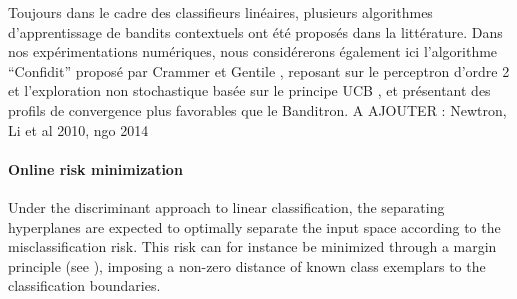 \documentclass[preprint,12pt,authoryear]{elsarticle}
\begin{document}
{\color{blue}
Toujours dans le cadre des classifieurs linéaires, plusieurs algorithmes d'apprentissage de bandits contextuels ont été proposés dans la littérature. Dans nos expérimentations numériques, nous considérerons également ici l'algorithme ``Confidit'' proposé par Crammer et Gentile \cite{crammer2013multiclass}, reposant sur le perceptron d'ordre 2 et l'exploration non stochastique basée sur le principe UCB \cite{lai1985asymptotically}, et présentant des profils de convergence plus favorables que le Banditron. A AJOUTER : Newtron, Li et al 2010, ngo 2014}



\paragraph{Online risk minimization}
Under the discriminant approach to linear classification, the separating hyperplanes are expected to optimally separate the input space according to the misclassification risk. This risk can for instance be minimized through a margin principle (see \cite{vapnik1998statistical}), imposing a non-zero distance of known class exemplars to the classification boundaries. 
\end{document}
